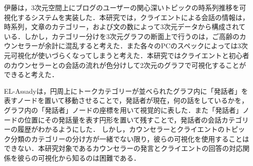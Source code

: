 \documentclass[shuuron]{kuee}
\begin{document}
伊藤\cite{itoh2010interactive}は，3次元空間上にブログのユーザーの関心深いトピックの時系列推移を可視化するシステムを実装した．本研究では，クライエントによる会話の情報は，時系列，文章のカテゴリー，および文の数によって3次元データから構成されている．しかし，カテゴリー分けを3次元グラフの断面上で行うのは，ご高齢のカウンセラーが余計に混乱すると考えた．また各々のPCのスペックによっては3次元可視化が使いづらくなってしまうと考えた．本研究ではクライエントと初心者のカウンセラーとの会話の流れが色分けして2次元のグラフで可視化することができると考えた．%

EL-Assady\cite{el2016contovi}は，円周上にトークカテゴリーが並べられたグラフ内に「発話者」を表すノードを置いて移動させることで，発話者が現在，何の話をしているかを，グラフ内の「発話者」ノードの座標を用いて視覚的に表した．また「発話者」ノードの位置にその発話量を表す円形を置いて残すことで，発話者の会話カテゴリーの履歴がわかるようにした．
しかし，カウンセラーとクライエントのトピック分類のカテゴリーの分け方が一緒でない限り，彼らの可視化を使用することはできない．本研究対象であるカウンセラーの発言とクライエントの回答の対応関係を彼らの可視化から知るのは困難である．



%
\end{document}
